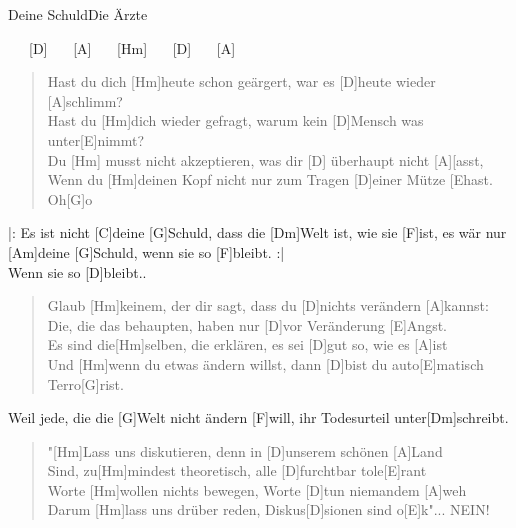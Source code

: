 \begin{song}{Deine Schuld}{Die Ärzte}

    \begin{intro}
        [Hm] \ \ \ [D] \ \ \ [A] \ \ \ [Hm] \ \ \ [D] \ \ \ [A]
    \end{intro}

    \begin{verse}
        Hast du dich [Hm]heute schon geärgert, war es [D]heute wieder [A]schlimm? \\
        Hast du [Hm]dich wieder gefragt, warum kein [D]Mensch was unter[E]nimmt? \\
        Du [Hm] musst nicht akzeptieren, was dir [D] überhaupt nicht [A][asst, \\
        Wenn du [Hm]deinen Kopf nicht nur zum Tragen [D]einer Mütze [Ehast. Oh[G]o
    \end{verse}

    \begin{chorus}
        |: Es ist nicht [C]deine [G]Schuld, dass die [Dm]Welt ist, wie sie [F]ist, es wär nur [Am]deine [G]Schuld, wenn sie so [F]bleibt. :| \\ 
        Wenn sie so [D]bleibt..
    \end{chorus}

    \begin{verse}
        Glaub [Hm]keinem, der dir sagt, dass du [D]nichts verändern [A]kannst:\\
        [Hm]Die, die das behaupten, haben nur [D]vor Veränderung [E]Angst.\\
        Es sind die[Hm]selben, die erklären, es sei [D]gut so, wie es [A]ist\\
        Und [Hm]wenn du etwas ändern willst, dann [D]bist du auto[E]matisch Terro[G]rist.
    \end{verse}


    \begin{bridge}
        Weil jede, die die [G]Welt nicht ändern [F]will, ihr Todesurteil unter[Dm]schreibt.
    \end{bridge}

    \begin{verse}
        "[Hm]Lass uns diskutieren, denn in [D]unserem schönen [A]Land\\
        Sind, zu[Hm]mindest theoretisch, alle [D]furchtbar tole[E]rant\\
        Worte [Hm]wollen nichts bewegen, Worte [D]tun niemandem [A]weh\\
        Darum [Hm]lass uns drüber reden, Diskus[D]sionen sind o[E]k"... NEIN!\\
    \end{verse}


\end{song}
